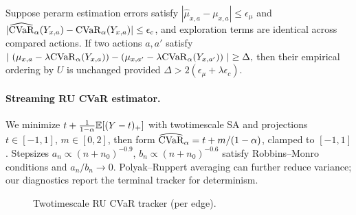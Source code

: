 \begin{proposition}
Suppose per\textendash arm estimation errors satisfy $|\hat\mu_{x,a}-\mu_{x,a}|\le \epsilon_\mu$ and $|\widehat{\mathrm{CVaR}}_\alpha(Y_{x,a})-\mathrm{CVaR}_\alpha(Y_{x,a})|\le \epsilon_c$, and exploration terms are identical across compared actions. If two actions $a,a'$ satisfy
$
|\ (\mu_{x,a}-\lambda \mathrm{CVaR}_\alpha(Y_{x,a}))-(\mu_{x,a'}-\lambda \mathrm{CVaR}_\alpha(Y_{x,a'}))\ |\ge \Delta,
$
then their empirical ordering by $U$ is unchanged provided $\Delta>2(\epsilon_\mu+\lambda \epsilon_c)$.
\end{proposition}

\paragraph{Streaming RU CVaR estimator.}
We minimize $t+\frac{1}{1-\alpha}\mathbb{E}[(Y-t)_+]$ with two\textendash timescale SA and projections $t\in[-1,1]$, $m\in[0,2]$, then form $\widehat{\mathrm{CVaR}}_\alpha=t+m/(1-\alpha)$, clamped to $[-1,1]$. Stepsizes $a_n\propto (n+n_0)^{-0.9}$, $b_n\propto (n+n_0)^{-0.6}$ satisfy Robbins--Monro conditions and $a_n/b_n\to 0$. Polyak–Ruppert averaging \cite{polyak1992averaging} can further reduce variance; our diagnostics report the terminal tracker for determinism.

\begin{figure}[t]
\centering
{}
\caption{Two\textendash timescale RU CVaR tracker (per edge).}
\label{alg:cvar}
\end{figure}

